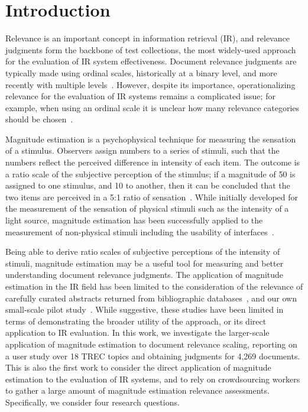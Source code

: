 
\section{Introduction}
\label{sec-intro}

Relevance is an important concept in information retrieval (IR), and
relevance judgments form the backbone of test collections, the most widely-used
approach
for the evaluation of IR system effectiveness.
Document relevance judgments are typically made using ordinal scales,
historically at a binary level, and more recently with multiple
levels~\citep{VooHar05}.
However, despite its importance, operationalizing relevance for
the evaluation of IR systems remains a 
complicated issue; for example,
when using an ordinal scale 
 it is unclear how many relevance categories should be
chosen~\cite{TanSha99}. 

Magnitude estimation is a psychophysical technique for measuring the
sensation of a stimulus.
Observers  assign numbers to a series of stimuli, such
that the numbers reflect the perceived difference in intensity of each
item.
The outcome is a ratio scale of the subjective perception of the
stimulus; if a magnitude of 50 is assigned to one stimulus, and 10 to
another, then it can be concluded that the two items are perceived in a
5:1 ratio of sensation~\cite{moskowitz:1977}.
While initially developed for the measurement of the sensation of
physical stimuli such as the intensity of a light source, magnitude
estimation has been successfully applied to the measurement of
non-physical stimuli including the usability of
interfaces~\cite{McG03}.

Being able to derive ratio scales of subjective perceptions of the
intensity of stimuli, magnitude estimation may be a useful tool for
measuring and better understanding document relevance judgments.
The application of magnitude estimation in the IR field has been
limited to the consideration of the relevance of carefully curated
abstracts returned from bibliographic databases~\citep{Eis88}, and our
own small-scale pilot study~\cite{SchMad14,MadMiz15}.
While suggestive, these studies have been limited in terms of
demonstrating the broader utility of the approach, or its direct
application to IR evaluation.
In this work, we investigate the larger-scale application of magnitude
estimation to document relevance scaling, reporting on a user study
over 18 TREC topics and obtaining judgments for 4,269 documents.
This is also the first work to consider the direct application of
magnitude estimation to the evaluation of IR systems, and to rely on
crowdsourcing workers to gather a large amount of magnitude estimation
relevance assessments.
Specifically, we consider four research questions.

